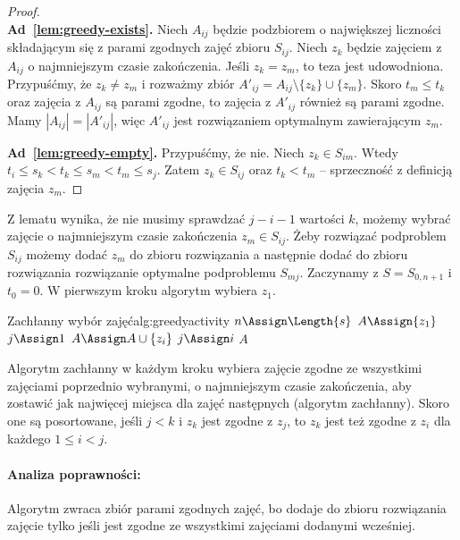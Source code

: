 \begin{proof}~\\
	\textbf{Ad~\ref{lem:greedy-exists}.} Niech $A_{ij}$ będzie podzbiorem o największej liczności składającym się z parami zgodnych zajęć zbioru $S_{ij}$. Niech $z_k$ będzie zajęciem z $A_{ij}$ o najmniejszym czasie zakończenia.
	Jeśli $z_k = z_m$, to teza jest udowodniona.
	Przypuśćmy, że $z_k \neq z_m$ i rozważmy zbiór $A'_{ij} = A_{ij} \setminus \{z_k\} \cup \{z_m\}$. Skoro $t_m \leq t_k$ oraz zajęcia z $A_{ij}$ są parami zgodne, to zajęcia z $A'_{ij}$ również są parami zgodne.
	Mamy $|A_{ij}| = |A'_{ij}|$, więc $A'_{ij}$ jest rozwiązaniem optymalnym zawierającym $z_m$.

	\textbf{Ad~\ref{lem:greedy-empty}.} Przypuśćmy, że nie. Niech $z_k \in S_{im}$. Wtedy $t_i \leq s_k < t_k \leq s_m < t_m \leq s_j$. Zatem $z_k \in S_{ij}$ oraz $t_k < t_m$ -- sprzeczność z definicją zajęcia $z_m$.
\end{proof}

Z lematu wynika, że nie musimy sprawdzać $j - i - 1$ wartości $k$, możemy wybrać zajęcie o najmniejszym czasie zakończenia $z_m \in S_{ij}$.
Żeby rozwiązać podproblem $S_{ij}$ możemy dodać $z_m$ do zbioru rozwiązania a następnie dodać do zbioru rozwiązania rozwiązanie optymalne podproblemu $S_{mj}$. Zaczynamy z $S = S_{0, n+1}$ i $t_0 = 0$. W pierwszym kroku algorytm wybiera $z_1$.

\begin{alg}{Zachłanny wybór zajęć}{alg:greedyactivity}
	 
	\State $n \Assign \Length{s}$
	\State $A \Assign \{z_1\}$ 
	\State $j \Assign 1$
	\State $A \Assign A \cup \{z_i\}$
	\State $j \Assign i$
	\EndIf
	\EndFor
	\State \Return $A$
	\EndFunction
\end{alg}

Algorytm zachłanny w każdym kroku wybiera zajęcie zgodne ze wszystkimi zajęciami poprzednio wybranymi, o najmniejszym czasie zakończenia, aby zostawić jak najwięcej miejsca dla zajęć następnych (algorytm zachłanny). Skoro one są posortowane, jeśli $j < k$ i $z_k$ jest zgodne z $z_j$, to $z_k$ jest też zgodne z $z_i$ dla każdego $1 \leq i < j$.

\paragraph{Analiza poprawności:}
Algorytm zwraca zbiór parami zgodnych zajęć, bo dodaje do zbioru rozwiązania zajęcie tylko jeśli jest zgodne ze wszystkimi zajęciami dodanymi wcześniej.

